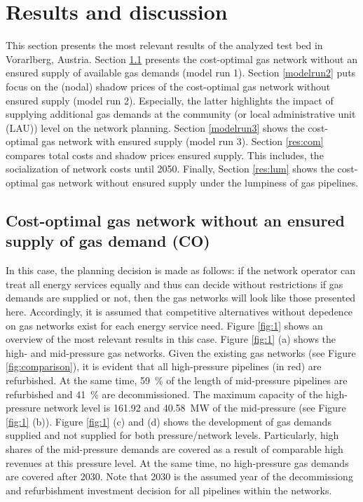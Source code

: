 \section{Results and discussion}\label{results}
This section presents the most relevant results of the analyzed test bed in Vorarlberg, Austria. Section \ref{modelrun1} presents the cost-optimal gas network without an ensured supply of available gas demands (model run 1). Section \ref{modelrun2} puts focus on the (nodal) shadow prices of the cost-optimal gas network without ensured supply (model run 2). Especially, the latter highlights the impact of supplying additional gas demands at the community (or local administrative unit (LAU)) level on the network planning. Section \ref{modelrun3} shows the cost-optimal gas network with ensured supply (model run 3). Section \ref{res:com} compares total costs and shadow prices  ensured supply. This includes, the socialization of network costs until 2050. Finally, Section \ref{res:lum} shows the cost-optimal gas network without ensured supply under the lumpiness of gas pipelines. 

\subsection{Cost-optimal gas network without an ensured supply of gas demand (CO)}\label{modelrun1}
In this case, the planning decision is made as follows: if the network operator can treat all energy services equally and thus can decide without restrictions if gas demands are supplied or not, then the gas networks will look like those presented here. Accordingly, it is assumed that competitive alternatives without depedence on gas networks exist for each energy service need.  Figure \ref{fig:1} shows an overview of the most relevant results in this case. Figure \ref{fig:1} (a) shows the high- and mid-pressure gas networks. Given the existing gas networks (see Figure \ref{fig:comparison}), it is evident that all high-pressure pipelines (in red) are refurbished. At the same time, \SI{59}{\%} of the length of mid-pressure pipelines are refurbished and \SI{41}{\%} are decommissioned. The maximum capacity of the high-pressure network level is \SI{161.92}{} and \SI{40.58}{MW} of the mid-pressure (see Figure \ref{fig:1} (b)). Figure \ref{fig:1} (c) and (d) shows the development of gas demands supplied and not supplied for both pressure/network levels. Particularly, high shares of the mid-pressure demands are covered as a result of comparable high revenues at this pressure level. At the same time, no high-pressure gas demands are covered after 2030. Note that 2030 is the assumed year of the decommissiong and refurbishment investment decision for all pipelines within the networks. 

